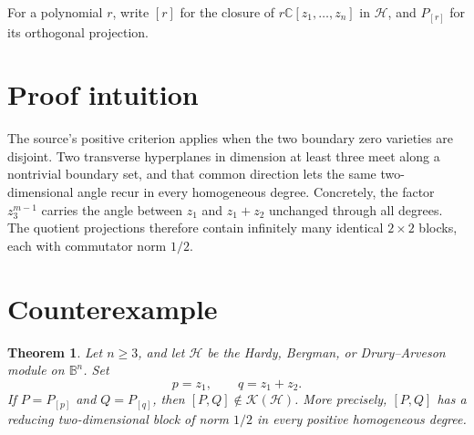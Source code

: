 \documentclass[11pt]{article}
\newtheorem{theorem}{Theorem}
\newcommand{\C}{\mathbb C}
\newcommand{\B}{\mathbb B}
\newcommand{\K}{\mathcal K}
\begin{document}
For a polynomial $r$, write $[r]$ for the closure of $r\C[z_1,\ldots,z_n]$
in $\mathcal H$, and $P_{[r]}$ for its orthogonal projection.

\section{Proof intuition}

The source's positive criterion applies when the two boundary zero varieties
are disjoint.  Two transverse hyperplanes in dimension at least three meet
along a nontrivial boundary set, and that common direction lets the same
two-dimensional angle recur in every homogeneous degree.  Concretely, the
factor $z_3^{m-1}$ carries the angle between $z_1$ and $z_1+z_2$ unchanged
through all degrees.  The quotient projections therefore contain infinitely
many identical $2\times2$ blocks, each with commutator norm $1/2$.

\section{Counterexample}

\begin{theorem}\label{thm:counterexample}
Let $n\ge3$, and let $\mathcal H$ be the Hardy, Bergman, or Drury--Arveson
module on $\B^n$. Set
\[
                    p=z_1,\qquad q=z_1+z_2.
\]
If $P=P_{[p]}$ and $Q=P_{[q]}$, then $[P,Q]\notin\K(\mathcal H)$. More
precisely, $[P,Q]$ has a reducing two-dimensional block of norm $1/2$ in
every positive homogeneous degree.
\end{theorem}
\end{document}
